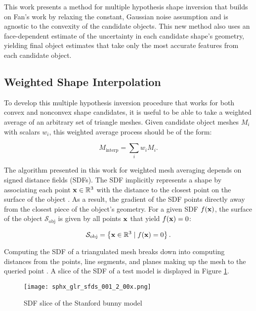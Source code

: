 This work presents a method for multiple hypothesis shape inversion that builds on Fan's work by relaxing the constant, Gaussian noise assumption and is agnostic to the convexity of the candidate objects. This new method also uses an face-dependent estimate of the uncertainty in each candidate shape's geometry, yielding final object estimates that take only the most accurate features from each candidate object.

\subsection{Weighted Shape Interpolation}

To develop this multiple hypothesis inversion procedure that works for both convex and nonconvex shape candidates, it is useful to be able to take a weighted average of an arbitrary set of triangle meshes. Given candidate object meshes $M_i$ with scalars $w_i$, this weighted average process should be of the form:

\begin{equation}
  M_{\mathrm{interp}} = \sum_{i}{w_i M_i}.
\end{equation}

The algorithm presented in this work for weighted mesh averaging depends on signed distance fields (SDFs). The SDF implicitly represents a shape by associating each point $\mathbf{x} \in \mathbb{R}^3$ with the distance to the closest point on the surface of the object \cite{baerentzen2002}. As a result, the gradient of the SDF points directly away from the closest piece of the object's geometry. For a given SDF $f(\mathbf{x})$, the surface of the object $\mathcal{S}_\mathrm{obj}$ is given by all points $\mathbf{x}$ that yield $f(\mathbf{x}) = 0$:

\begin{equation} \label{eq:sdf_zero_level_set}
  \mathcal{S}_\mathrm{obj} = \left\{ \mathbf{x} \in \mathbb{R}^3 \mid f(\mathbf{x}) = 0 \right\}.
\end{equation}

Computing the SDF of a triangulated mesh breaks down into computing distances from the points, line segments, and planes making up the mesh to the queried point \cite{baerentzen2002}. A slice of the SDF of a test model is displayed in Figure \ref{fig:sdf_slice}.

\graphicspath{{/Users/liamrobinson/Documents/PyLightCurves/docs/build/html/_images}}
\begin{figure}[!htb]
  \centering
  \texttt{[image: sphx\_glr\_sfds\_001\_2\_00x.png]}
  \caption{SDF slice of the Stanford bunny model}
  \label{fig:sdf_slice}
\end{figure}

